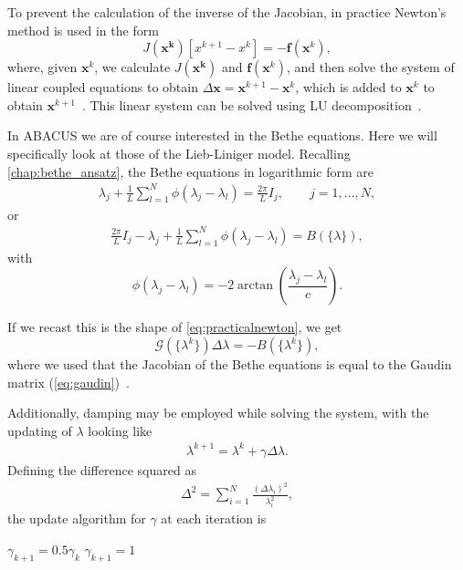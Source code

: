 \documentclass[11pt, a4paper]{report} %
\begin{document}
To prevent the calculation of the inverse of the Jacobian, in practice Newton's method is used in the form
\begin{equation}\label{eq:practicalnewton}
  J(\mathbf{x^k})[x^{k+1} - x^k] = - \mathbf{f}(\mathbf{x}^k),
\end{equation}
where, given \(\mathbf{x}^k\), we calculate \(J(\mathbf{x^k})\) and \( \mathbf{f}(\mathbf{x}^k)\), and then solve the system of linear coupled equations to obtain \(\Delta\mathbf{x}=\mathbf{x}^{k+1} - \mathbf{x}^k\), which is added to \(\mathbf{x}^k\) to obtain \(\mathbf{x}^{k+1}\)~\cite{Sueli2003}. 
This linear system can be solved using LU decomposition~\cite{Press2007}.

In ABACUS we are of course interested in the Bethe equations.
Here we will specifically look at those of the Lieb-Liniger model.
Recalling \cref{chap:bethe_ansatz}, the Bethe equations in logarithmic form are 
\begin{align}
  \lambda_j + \frac{1}{L} \sum_{l=1}^N \phi(\lambda_j - \lambda_l) = \frac{2\pi}{L}I_j, \qquad j = 1,\ldots,N,
\end{align}
or
\begin{align}
  \frac{2\pi}{L}I_j - \lambda_j + \frac{1}{L} \sum_{l=1}^N \phi(\lambda_j - \lambda_l) = B(\{\lambda\}),
\end{align}
with
\begin{equation}
  \phi(\lambda_j - \lambda_l) = -2\arctan\left(\frac{\lambda_j-\lambda_l}{c}\right).
\end{equation}

If we recast this is the shape of \cref{eq:practicalnewton}, we get
\begin{equation}
  \mathcal{G}(\{\lambda^k\}) \Delta \lambda = -B(\{\lambda^k\}),
\end{equation}
where we used that the Jacobian of the Bethe equations is equal to the Gaudin matrix (\cref{eq:gaudin})~\cite{Caux2009}.

Additionally, damping may be employed while solving the system, with the updating of \(\lambda\) looking like
\begin{align}
  \label{eq:dampednewton}
  \lambda^{k+1} = \lambda^k + \gamma \Delta \lambda.
\end{align}
Defining the difference squared as
\begin{align}
  \label{eq:51}
  \Delta^2 = \sum_{i=1}^N \frac{(\Delta \lambda_i)^2}{\lambda_i^2},
\end{align}
the update algorithm for \(\gamma\) at each iteration is
\begin{algorithm}
  \begin{algorithmic}[0]
    \State $\gamma_{k+1} = 0.5 \gamma_{k}$
    \State $\gamma_{k+1} = 1$
    \EndIf
  \end{algorithmic}
\end{algorithm}
\end{document}
